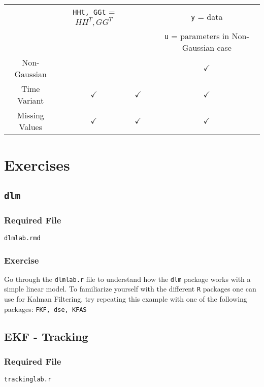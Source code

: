 \documentclass{article}
\begin{document}
\begin{landscape}
\begin{tabular}{c | c | c | c | c}
& \verb|HHt, GGt| = $HH^T, GG^T$& & &\verb|y| = data\\
& & & &\verb|u| = parameters in Non-Gaussian case\\
\hline
\hline

Non-Gaussian &  &  &  & $\checkmark$ \\ 
\hline
Time Variant & $\checkmark$& $\checkmark$&  & $\checkmark$\\ 
\hline
Missing Values & $\checkmark$ & $\checkmark$&   & $\checkmark$ \\ 
\hline
\hline
\end{tabular}

\vspace{30pt}
\end{landscape}

\section{Exercises}

\subsection{\tt dlm}
\subsubsection*{Required File}
\verb|dlmlab.rmd| 
\subsubsection*{Exercise}
Go through the \verb|dlmlab.r| file to understand how the \verb|dlm| package works with a simple linear model. To familiarize yourself with the different \verb|R| packages one can use for Kalman Filtering, try repeating this example with one of the following packages: \verb|FKF, dse, KFAS| 


\subsection{EKF - Tracking}
\subsubsection*{Required File}
 \verb|trackinglab.r|
\end{document}
